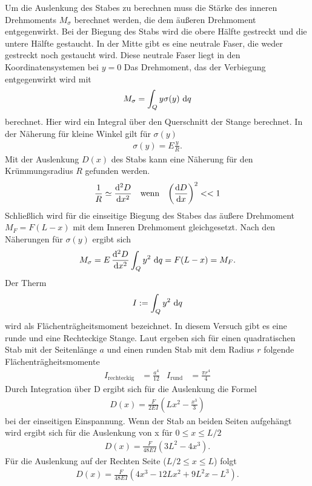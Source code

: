 Um die Auslenkung des Stabes zu berechnen muss die Stärke des inneren Drehmoments $M_\sigma$ berechnet werden, 
die dem äußeren Drehmoment entgegenwirkt.
Bei der Biegung des Stabs wird die obere Hälfte gestreckt und die untere Hälfte gestaucht.
In der Mitte gibt es eine neutrale Faser, die weder gestreckt noch gestaucht wird.
Diese neutrale Faser liegt in den Koordinatensystemen bei $y = 0$ 
Das Drehmoment, das der Verbiegung entgegenwirkt wird mit 
\begin{align}
    M_\sigma = \int_{Q}^{} y \sigma(y) \,\mathop{}\!\mathrm{d} q 
    \label{eq:inneres_Moment_int}
\end{align}
berechnet.
Hier wird ein Integral über den Querschnitt der Stange berechnet.
In der Näherung für kleine Winkel gilt für $\sigma(y)$
\begin{align*}
    \sigma(y) = E \frac{y}{R} .
\end{align*}
Mit der Auslenkung $D(x)$ des Stabs kann eine Näherung für den Krümmungsradius $R$ gefunden werden.
\begin{align*}
    \frac{1}{R} &\simeq  \frac{\mathop{}\!\mathrm{d}^2 D}{\mathop{}\!\mathrm{d} x^2} & &\text{wenn} & \left(\frac{\mathop{}\!\mathrm{d} D}{\mathop{}\!\mathrm{d} x}\right)^2 << 1 
\end{align*}
Schließlich wird für die einseitige Biegung des Stabes das äußere Drehmoment $M_F = F(L - x)$ mit dem Inneren Drehmoment gleichgesetzt.
Nach den Näherungen für $\sigma(y)$ ergibt sich
\begin{align}
    M_\sigma = E \, \frac{\diff^2 D}{\diff x^2} \int_{Q} y^2 \,\diff q = F (L - x) = M_F  . %
    \label{eq:Momentengleichung_einseitig}
\end{align}
Der Therm 
\begin{align}
    I := \int_{Q} y^2 \,\mathop{}\!\mathrm{d} q
\end{align} 
wird als Flächenträgheitsmoment bezeichnet.
In diesem Versuch gibt es eine runde und eine Rechteckige Stange.
Laut \cite{uni_siegen} ergeben sich für einen quadratischen Stab mit der Seitenlänge $a$ und einen runden Stab mit dem Radius $r$ folgende Flächenträgheitsmomente
\begin{align}
    I_\text{rechteckig} &= \frac{a^4}{12} & I_\text{rund} &= \frac{\pi r^4}{4}
    \label{eq:Flachentragheitsmomente}
\end{align}
%
Durch Integration über D ergibt sich für die Auslenkung die Formel
\begin{align}
    D(x) = \frac{F}{2 E I} \left(L x^2 - \frac{x^3}{3} \right)
    \label{eq:D_x_einseitig}
\end{align}
bei der einseitigen Einspannung.
Wenn der Stab an beiden Seiten aufgehängt wird ergibt sich für die Auslenkung von x für
$0 \leq x \leq L/2$
\begin{align}
    D(x) = \frac{F}{48 E I} \left(3 L^2- 4 x^3\right).
    \label{eq:D_x_links}
\end{align}
Für die Auslenkung auf der Rechten Seite ($L/2 \leq x \leq L $) folgt
\begin{align}
    D(x) = \frac{F}{48 E I} \left(4x^3 - 12L x^2 + 9L^2 x - L^3 \right). 
    \label{eq:D_x_beidseitig_links}
\end{align}